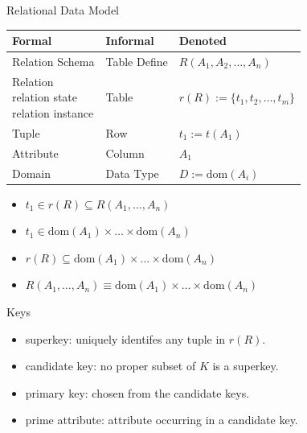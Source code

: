 \documentclass[a4paper]{article}
\begin{document}


\begin{cheatsheetblock}{Relational Data Model}
    \begin{tabularx}{\linewidth}{|X|X|X|}
        \hline
        \textbf{Formal} & \textbf{Informal} & \textbf{Denoted}                             \\
        \hline
        Relation Schema & Table Define      & $R(A_1, A_2,\allowbreak\dots, A_n)$          \\
        \hline
        \makecell[l]{Relation                                                              \\relation state\\relation instance}
                        & Table             & $r(R) := \{t_1, t_2\allowbreak,\dots, t_m\}$ \\
        \hline
        Tuple           & Row               & $t_1:=t(A_1)$                                \\
        \hline
        Attribute       & Column            & $A_1$                                        \\
        \hline
        Domain          & Data Type         & $D:=\mathrm{dom}(A_i)$                       \\
        \hline
    \end{tabularx}
    \begin{itemize}[topsep=0pt, noitemsep, ]
        \item $t_1 \in r(R) \subseteq R(A_1, \dots, A_n)$
        \item $t_1 \in \mathrm{dom}(A_1) \times \dots \times \mathrm{dom}(A_n)$
        \item $r(R) \subseteq \mathrm{dom}(A_1) \times \dots \times \mathrm{dom}(A_n)$
        \item $R(A_1, \dots, A_n) \equiv \mathrm{dom}(A_1) \times \dots \times \mathrm{dom}(A_n)$
    \end{itemize}
\end{cheatsheetblock}

\begin{cheatsheetblock}{Keys}
    \begin{itemize}
        \item superkey: uniquely identifes any tuple in $r(R)$.
        \item candidate key: no proper subset of $K$ is a superkey.
        \item primary key: chosen from the candidate keys.
        \item prime attribute: attribute occurring in a candidate key.
    \end{itemize}
\end{cheatsheetblock}
\end{document}
